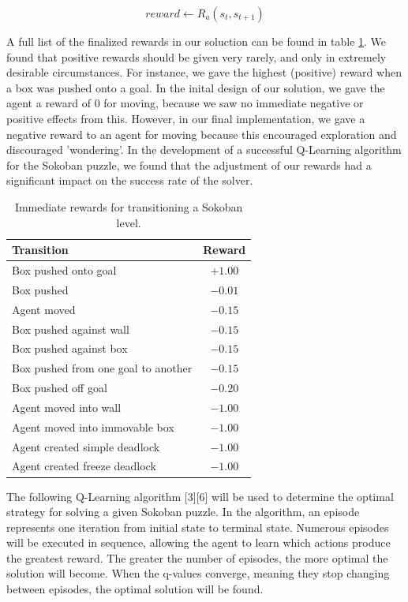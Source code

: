 \documentclass[times, 10pt,twocolumn]{article}
\begin{document}
\begin{equation}
reward \gets R_a(s_t, s_{t+1})
\label{eq:reward}
\end{equation}

A full list of the finalized rewards in our soluction can be found in table \ref{table:rewards}.  We found that positive rewards should be given very rarely, and only in extremely desirable circumstances.  For instance, we gave the highest (positive) reward when a box was pushed onto a goal.  In the inital design of our solution, we gave the agent a reward of 0 for moving, because we saw no immediate negative or positive effects from this.  However, in our final implementation, we gave a negative reward to an agent for moving because this encouraged exploration and discouraged 'wondering'.  In the development of a successful Q-Learning algorithm for the Sokoban puzzle, we found that the adjustment of our rewards had a significant impact on the success rate of the solver.

\begin{table}[htbp]
  \centering
  \begin{tabular}{l c} \hline\hline
    Transition & Reward \\ \hline
    Box pushed onto goal & $+1.00$ \\
    Box pushed & $-0.01$ \\
    Agent moved & $-0.15$ \\
    Box pushed against wall & $-0.15$ \\
    Box pushed against box & $-0.15$ \\
    Box pushed from one goal to another & $-0.15$ \\
    Box pushed off goal & $-0.20$ \\ 
    Agent moved into wall & $-1.00$ \\
    Agent moved into immovable box & $-1.00$ \\
    Agent created simple deadlock & $-1.00$ \\
    Agent created freeze deadlock & $-1.00$ \\ \hline\hline
  \end{tabular}
  \caption{Immediate rewards for transitioning a Sokoban level.}
  \label{table:rewards}
\end{table}


The following Q-Learning algorithm [3][6] will be used to determine the optimal strategy for solving a given Sokoban puzzle. In the algorithm, an episode represents one iteration from initial state to terminal state. Numerous episodes will be executed in sequence, allowing the agent to learn which actions produce the greatest reward. The greater the number of episodes, the more optimal the solution will become. When the q-values converge, meaning they stop changing between episodes, the optimal solution will be found.
\end{document}

